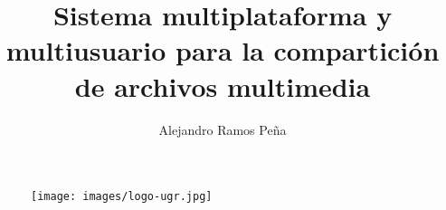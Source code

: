 \documentclass[16pt]{article}
\title{Sistema multiplataforma y multiusuario para la compartición de
archivos multimedia}
\author{Alejandro Ramos Peña}
\begin{document}
\begin{titlingpage}
  \maketitle
  \begin{figure}[!h]
    \centering
    \texttt{[image: images/logo-ugr.jpg]}
  \end{figure}
\end{titlingpage}



\tableofcontents
\newpage


















\end{document}
